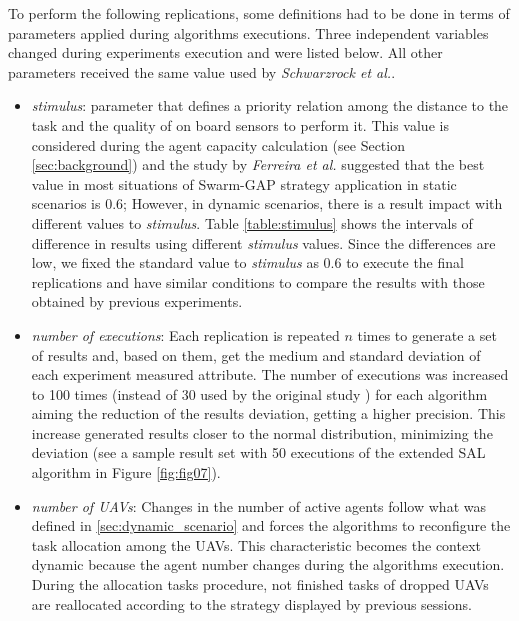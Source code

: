 To perform the following replications, some definitions had to be done in terms of parameters applied during algorithms executions. Three independent variables changed during experiments execution and were listed below. All other parameters received the same value used by \textit{Schwarzrock et al.}\cite{MAS07}.
\begin{itemize}
   \item \textit{stimulus}: parameter that defines a priority relation among the distance to the task and the quality of on board sensors to perform it. This value is considered during the agent capacity calculation (see Section \ref{sec:background}) and the study by \textit{Ferreira et al.} \cite{ferreira2010robocup} suggested that the best value in most situations of Swarm-GAP strategy application in static scenarios is $0.6$; However, in dynamic scenarios, there is a result impact with different values to \textit{stimulus}. Table \ref{table:stimulus} shows the intervals of difference in results using different \textit{stimulus} values. Since the differences are low, we fixed the standard value to \textit{stimulus} as $0.6$ to execute the final replications and have similar conditions to compare the results with those obtained by previous experiments.
   \item \textit{number of executions}: Each replication is repeated $n$ times to generate a set of results and, based on them, get the medium and standard deviation of each experiment measured attribute. The number of executions was increased to 100 times (instead of 30 used by the original study \cite{MAS07}) for each algorithm aiming the reduction of the results deviation, getting a higher precision. This increase generated results closer to the normal distribution, minimizing the deviation (see a sample result set with 50 executions of the extended SAL algorithm in Figure \ref{fig:fig07}).
   \item \textit{number of UAVs}: Changes in the number of active agents follow what was defined in \ref{sec:dynamic_scenario} and forces the algorithms to reconfigure the task allocation among the UAVs. This characteristic becomes the context dynamic because the agent number changes during the algorithms execution. During the allocation tasks procedure, not finished tasks of dropped UAVs are reallocated according to the strategy displayed by previous sessions.
\end{itemize}

